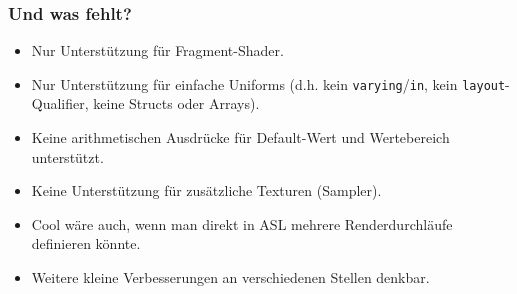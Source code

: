 \documentclass{beamer}
\begin{document}
\begin{frame}
    \frametitle{Und was fehlt?}
    \begin{itemize}
        \item Nur Unterstützung für Fragment-Shader.
        \item Nur Unterstützung für einfache Uniforms (d.h. kein
            \lstinline$varying$/\lstinline$in$, kein \lstinline$layout$-Qualifier,
            keine Structs oder Arrays).
        \item Keine arithmetischen Ausdrücke für Default-Wert und Wertebereich unterstützt.
        \item Keine Unterstützung für zusätzliche Texturen (Sampler).
        \item Cool wäre auch, wenn man direkt in ASL mehrere Renderdurchläufe definieren könnte.
        \item Weitere kleine Verbesserungen an verschiedenen Stellen denkbar.
    \end{itemize}
\end{frame}
\end{document}

